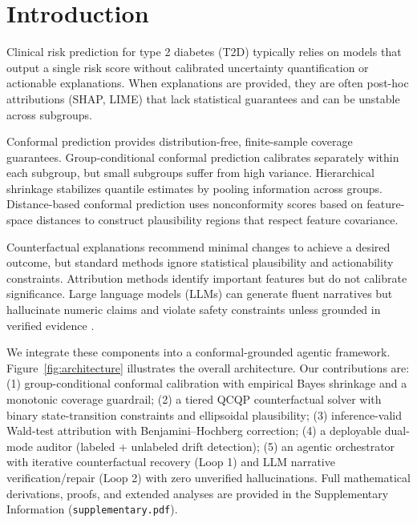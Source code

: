 \documentclass[11pt,a4paper]{article}
\theoremstyle{plain}
\begin{document}
\section{Introduction}
\label{sec:introduction}

Clinical risk prediction for type 2 diabetes (T2D) typically relies on models that output a single risk score without calibrated uncertainty quantification or actionable explanations. When explanations are provided, they are often post-hoc attributions (SHAP, LIME) that lack statistical guarantees and can be unstable across subgroups.

Conformal prediction \cite{vovk2005algorithmic, shafer2008tutorial, angelopoulos2021gentle} provides distribution-free, finite-sample coverage guarantees. Group-conditional conformal prediction \cite{lei2018distribution, romano2019conformalized, melki2023group} calibrates separately within each subgroup, but small subgroups suffer from high variance. Hierarchical shrinkage \cite{dunn2023distribution} stabilizes quantile estimates by pooling information across groups. Distance-based conformal prediction uses nonconformity scores based on feature-space distances to construct plausibility regions that respect feature covariance.

Counterfactual explanations \cite{wachter2017counterfactual} recommend minimal changes to achieve a desired outcome, but standard methods ignore statistical plausibility and actionability constraints. Attribution methods \cite{lundberg2017unified} identify important features but do not calibrate significance. Large language models (LLMs) can generate fluent narratives but hallucinate numeric claims and violate safety constraints unless grounded in verified evidence \cite{yao2023react, schick2023toolformer}.

We integrate these components into a conformal-grounded agentic framework. Figure~\ref{fig:architecture} illustrates the overall architecture. Our contributions are: (1) group-conditional conformal calibration with empirical Bayes shrinkage and a monotonic coverage guardrail; (2) a tiered QCQP counterfactual solver with binary state-transition constraints and ellipsoidal plausibility; (3) inference-valid Wald-test attribution with Benjamini--Hochberg correction; (4) a deployable dual-mode auditor (labeled + unlabeled drift detection); (5) an agentic orchestrator with iterative counterfactual recovery (Loop 1) and LLM narrative verification/repair (Loop 2) with zero unverified hallucinations. Full mathematical derivations, proofs, and extended analyses are provided in the Supplementary Information (\texttt{supplementary.pdf}).
\end{document}
